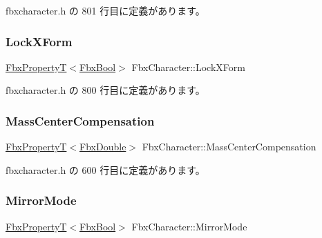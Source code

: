  fbxcharacter.\+h の 801 行目に定義があります。

\mbox{\label{class_fbx_character_a76c5887a0ed952165cca32f065d2899c}} 
\subsubsection{\texorpdfstring{Lock\+X\+Form}{LockXForm}}
{\footnotesize\ttfamily \hyperlink{class_fbx_property_t}{Fbx\+PropertyT}$<$\hyperlink{fbxtypes_8h_a92e0562b2fe33e76a242f498b362262e}{Fbx\+Bool}$>$ Fbx\+Character\+::\+Lock\+X\+Form}



 fbxcharacter.\+h の 800 行目に定義があります。

\mbox{\label{class_fbx_character_ac19cd028c848d564b39a0b5d1986f8d8}} 
\subsubsection{\texorpdfstring{Mass\+Center\+Compensation}{MassCenterCompensation}}
{\footnotesize\ttfamily \hyperlink{class_fbx_property_t}{Fbx\+PropertyT}$<$\hyperlink{fbxtypes_8h_a171e72a1c46fc15c1a6c9c31948c1c5b}{Fbx\+Double}$>$ Fbx\+Character\+::\+Mass\+Center\+Compensation}



 fbxcharacter.\+h の 600 行目に定義があります。

\mbox{\label{class_fbx_character_a68d6080dfb8f35af92d28760d40dccdf}} 
\subsubsection{\texorpdfstring{Mirror\+Mode}{MirrorMode}}
{\footnotesize\ttfamily \hyperlink{class_fbx_property_t}{Fbx\+PropertyT}$<$\hyperlink{fbxtypes_8h_a92e0562b2fe33e76a242f498b362262e}{Fbx\+Bool}$>$ Fbx\+Character\+::\+Mirror\+Mode}



